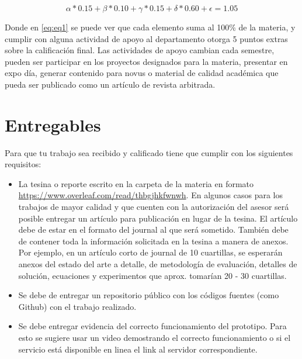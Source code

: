 \documentclass[letterpaper, 10 pt, conference]{ieeeconf}  %
\begin{document}
\begin{equation}
\label{eq:eq1}
\alpha * 0.15 + \beta * 0.10 + \gamma * 0.15 + \delta * 0.60 + \epsilon =  1.05    
\end{equation} 


Donde en \autoref{eq:eq1} se puede ver que cada elemento suma al 100\% de la materia, y cumplir con alguna actividad de apoyo al departamento otorga 5 puntos extras sobre la calificación final. Las actividades de apoyo cambian cada semestre, pueden ser participar en los proyectos designados para la materia, presentar en expo día, generar contenido para novus o material de calidad académica que pueda ser publicado como un artículo de revista arbitrada.

\section{Entregables}

Para que tu trabajo sea recibido y calificado tiene que cumplir con los siguientes requisitos:
\begin{itemize}
     \item La tesina o reporte escrito en la carpeta de la materia en formato \url{https://www.overleaf.com/read/thbgjhkfwnwh}. En algunos casos para los trabajos de mayor calidad y que cuenten con la autorización del asesor será posible entregar un artículo para publicación en lugar de la tesina. El artículo debe de estar en el formato del journal al que será sometido. También debe de contener toda la información solicitada en la tesina a manera de anexos. Por ejemplo, en un artículo corto de journal de 10 cuartillas, se esperarán anexos del estado del arte a detalle, de metodología de evaluación, detalles de solución, ecuaciones y experimentos que aprox. tomarían 20 - 30 cuartillas.
     \item Se debe de entregar un repositorio público con los códigos fuentes (como Github) con el trabajo realizado.
     \item Se debe entregar evidencia del correcto funcionamiento del prototipo. Para esto se sugiere usar un video demostrando el correcto funcionamiento o si el servicio está disponible en linea el link al servidor correspondiente.
\end{itemize}
\end{document}
